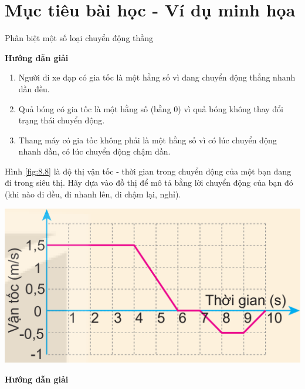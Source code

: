 \section{Mục tiêu bài học - Ví dụ minh họa}
\begin{dang}{Phân biệt một số loại chuyển động thẳng }
	{	\begin{center}
			\textbf{Hướng dẫn giải}
		\end{center}
	\begin{enumerate}[label=\alph*)]
		\item Người đi xe đạp có gia tốc là một hằng số vì đang chuyển động thẳng nhanh dần đều.
		\item Quả bóng có gia tốc là một hằng số (bằng 0) vì quả bóng không thay đổi trạng thái chuyển động.
		\item Thang máy có gia tốc không phải là một hằng số vì có lúc chuyển động nhanh dần, có lúc chuyển động chậm dần.
	\end{enumerate}
	}
{Hình \ref{fig:8.8} là độ thị vận tốc - thời gian trong chuyển động của một bạn đang đi trong siêu thị. Hãy dựa vào đồ thị để mô tả bằng lời chuyển động của bạn đó (khi nào đi đều, đi nhanh lên, đi chậm lại, nghỉ).
\begin{center}
	\includegraphics[width=0.4\linewidth]{../figs/VN10-2023-PH-TP008-8}
	\label{fig:8.8}
\end{center}
}
{\begin{center}
		\textbf{Hướng dẫn giải}
	\end{center}
}
\end{dang}
